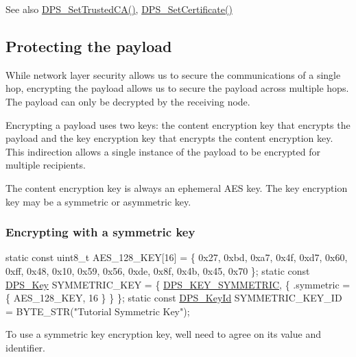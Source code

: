\begin{DoxySeeAlso}{See also}
\hyperlink{group__keystore_ga8d55f887ebbd6b0af80caa43bf77a088}{D\+P\+S\+\_\+\+Set\+Trusted\+C\+A()}, \hyperlink{group__keystore_ga7a8c6874dd5bff0a6391a5515b545e17}{D\+P\+S\+\_\+\+Set\+Certificate()}
\end{DoxySeeAlso}
\hypertarget{tutorials-security_protecting-the-payload}{}\subsection{Protecting the payload}\label{tutorials-security_protecting-the-payload}
While network layer security allows us to secure the communications of a single hop, encrypting the payload allows us to secure the payload across multiple hops. The payload can only be decrypted by the receiving node.

Encrypting a payload uses two keys\+: the content encryption key that encrypts the payload and the key encryption key that encrypts the content encryption key. This indirection allows a single instance of the payload to be encrypted for multiple recipients.

The content encryption key is always an ephemeral A\+ES key. The key encryption key may be a symmetric or asymmetric key.\hypertarget{tutorials-security_encrypting-with-a-symmetric-key}{}\subsubsection{Encrypting with a symmetric key}\label{tutorials-security_encrypting-with-a-symmetric-key}

\begin{DoxyCodeInclude}
\textcolor{keyword}{static} \textcolor{keyword}{const} uint8\_t AES\_128\_KEY[16] = \{
    0x27, 0xbd, 0xa7, 0x4f, 0xd7, 0x60, 0xff, 0x48, 0x10, 0x59, 0x56, 0xde, 0x8f, 0x4b, 0x45, 0x70
\};
\textcolor{keyword}{static} \textcolor{keyword}{const} \hyperlink{struct___d_p_s___key}{DPS\_Key} SYMMETRIC\_KEY = \{ \hyperlink{group__keystore_gga7ca1045749c725e9c4a1b4758b2a0196a662c1e84628d96be8ae08163af382392}{DPS\_KEY\_SYMMETRIC}, \{ .symmetric = \{ 
      AES\_128\_KEY, 16 \} \} \};
\textcolor{keyword}{static} \textcolor{keyword}{const} \hyperlink{struct___d_p_s___key_id}{DPS\_KeyId} SYMMETRIC\_KEY\_ID = BYTE\_STR(\textcolor{stringliteral}{"Tutorial Symmetric Key"});
\end{DoxyCodeInclude}
To use a symmetric key encryption key, we\textquotesingle{}ll need to agree on its value and identifier.


